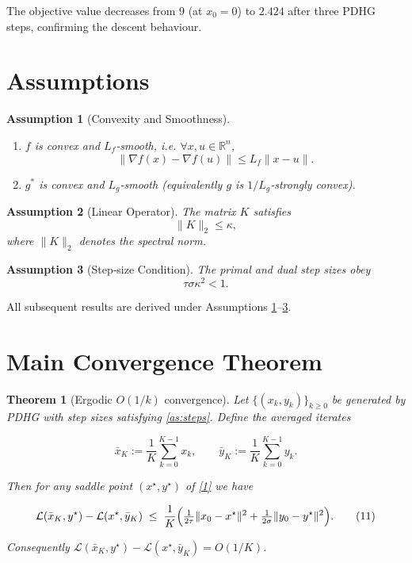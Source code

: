 \documentclass{article}
\newtheorem{theorem}{Theorem}
\newtheorem{assumption}{Assumption}
\begin{document}
The objective value decreases from $9$ (at $x_{0}=0$) to $2.424$ after three PDHG steps, confirming the descent behaviour.

\section*{Assumptions}
\begin{assumption}[Convexity and Smoothness]\label{as:convex}
\begin{enumerate}[label=\alph*)]
\item $f$ is convex and $L_{f}$‑smooth, i.e. $\forall x,u\in\mathbb R^{n}$,
\[
\|\nabla f(x)-\nabla f(u)\|\le L_{f}\|x-u\|.
\tag{7}
\]
\item $g^{*}$ is convex and $L_{g}$‑smooth (equivalently $g$ is $1/L_{g}$‑strongly convex).
\end{enumerate}
\end{assumption}

\begin{assumption}[Linear Operator]\label{as:K}
The matrix $K$ satisfies
\[
\|K\|_{2}\le \kappa,
\tag{8}
\]
where $\|K\|_{2}$ denotes the spectral norm.
\end{assumption}

\begin{assumption}[Step‑size Condition]\label{as:steps}
The primal and dual step sizes obey
\[
\tau\sigma\kappa^{2}<1.
\tag{9}
\]
\end{assumption}

All subsequent results are derived under Assumptions \ref{as:convex}–\ref{as:steps}.

\section*{Main Convergence Theorem}
\begin{theorem}[Ergodic $O(1/k)$ convergence]\label{thm:ergodic}
Let $\{(x_{k},y_{k})\}_{k\ge0}$ be generated by PDHG with step sizes satisfying \eqref{as:steps}.  
Define the averaged iterates  

\[
\bar x_{K}:=\frac{1}{K}\sum_{k=0}^{K-1}x_{k},
\qquad
\bar y_{K}:=\frac{1}{K}\sum_{k=0}^{K-1}y_{k}.
\tag{10}
\]

Then for any saddle point $(x^{\star},y^{\star})$ of \eqref{1} we have  

\[
\mathcal L(\bar x_{K},y^{\star})-\mathcal L(x^{\star},\bar y_{K})
\;\le\;
\frac{1}{K}\Bigl(\tfrac{1}{2\tau}\|x_{0}-x^{\star}\|^{2}
+\tfrac{1}{2\sigma}\|y_{0}-y^{\star}\|^{2}\Bigr).
\tag{11}
\]

Consequently $\mathcal L(\bar x_{K},y^{\star})-\mathcal L(x^{\star},\bar y_{K})=O(1/K)$.
\end{theorem}
\end{document}
